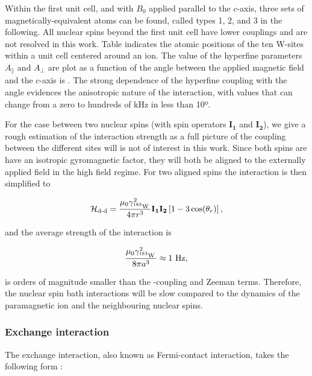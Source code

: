 Within the first unit cell, and with $B_0$ applied parallel to the $c$-axis, three sets of magnetically-equivalent \W atoms can be found, called types 1, 2, and 3 in the following. All \W nuclear spins beyond the first unit cell have lower couplings and are not resolved in this work. Table  indicates the atomic positions of the ten W-sites within a unit cell centered around an \Er ion. The value of the hyperfine parameters $A_\parallel$ and $A_\perp$ are plot as a function of the angle between the applied magnetic field and the $c$-axis is . The strong dependence of the hyperfine coupling with the angle evidences the anisotropic nature of the interaction, with values that can change from a zero to hundreds of kHz in less than 10º.

For the case between two \W nuclear spins (with spin operators $\mathbf{I_1}$ and $\mathbf{I_2}$), we give a rough estimation of the interaction strength as a full picture of the coupling between the different sites will is not of interest in this work. Since both spins are have an isotropic gyromagnetic factor, they will both be aligned to the externally applied field in the high field regime. For two aligned spins the interaction is then simplified to

\begin{equation}
    \mathcal{H}_{\text{d-d}} = \frac{\mu_0\gamma_{\text{$^{183}$W\,}}^2}{4\pi r^3}  \mathbf{I_1} \mathbf{I_2} \left[ 1 - 3\cos(\theta_r) \right],
\end{equation}

\noindent and the average strength of the interaction is

\begin{equation}
    \frac{\mu_0\gamma_{\text{$^{183}$W\,}}^2}{8\pi a^3} \approx 1\text{~Hz}, 
\end{equation} 

\noindent is orders of magnitude smaller than the \Er-\W coupling and Zeeman terms. Therefore, the nuclear spin bath interactions will be slow compared to the dynamics of the paramagnetic ion and the neighbouring nuclear spins.

\subsubsection{Exchange interaction}

The exchange interaction, also known as Fermi-contact interaction, takes the following form :

